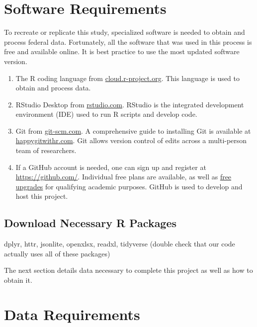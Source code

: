 \documentclass[
]{book}
\begin{document}
\hypertarget{software-requirements}{%
\chapter{Software Requirements}\label{software-requirements}}

To recreate or replicate this study, specialized software is needed to obtain and process federal data. Fortunately, all the software that was used in this process is free and available online. It is best practice to use the most updated software version.

\begin{enumerate}
\def\labelenumi{\arabic{enumi}.}
\item
  The R coding language from \href{https://cloud.r-project.org/}{cloud.r-project.org}. This language is used to obtain and process data.
\item
  RStudio Desktop from \href{https://rstudio.com/products/rstudio/download/\#download}{rstudio.com}. RStudio is the integrated development environment (IDE) used to run R scripts and develop code.
\item
  Git from \href{https://git-scm.com/downloads}{git-scm.com}. A comprehensive guide to installing Git is available at \href{https://happygitwithr.com/install-git.html}{happygitwithr.com}. Git allows version control of edits across a multi-person team of researchers.
\item
  If a GitHub account is needed, one can sign up and register at \url{https://github.com/}. Individual free plans are available, as well as \href{https://help.github.com/en/articles/applying-for-an-educator-or-researcher-discount}{free upgrades} for qualifying academic purposes. GitHub is used to develop and host this project.
\end{enumerate}

\hypertarget{download-necessary-r-packages}{%
\section{Download Necessary R Packages}\label{download-necessary-r-packages}}

dplyr, httr, jsonlite, openxlsx, readxl, tidyverse (double check that our code actually uses all of these packages)

The next section details data necessary to complete this project as well as how to obtain it.

\hypertarget{data-requirements}{%
\chapter{Data Requirements}\label{data-requirements}}
\end{document}
